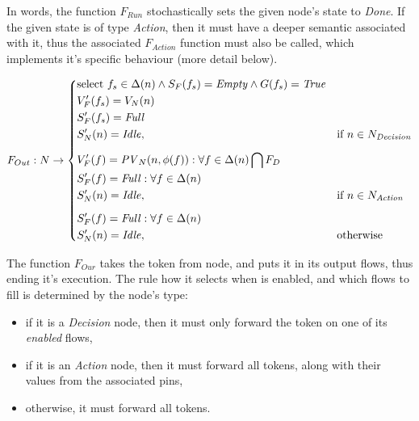 \begin{definition}
In words, the function \(F_{Run}\) stochastically sets the given node's state to \emph{Done}. If the given state is of type \emph{Action}, then it must have a deeper semantic associated with it, thus the associated \(F_{Action}\) function must also be called, which implements it's specific behaviour (more detail below).

\begin{equation}
	F_{Out} : N \rightarrow
	\begin{cases}
		\begin{aligned}[b]
			&\text{select } f_s \in \Delta(n) \wedge S_F(f_s) = \mathit{Empty} \wedge G(f_s) = \mathit{True} \\
			&V_F^\prime(f_s) = V_N(n) \\
			&S_F^\prime(f_s) = \mathit{Full} \\
			&S_N^\prime(n) = \mathit{Idle},
		\end{aligned} & \text{if } n \in N_\mathit{Decision} \\[8pt]
		\begin{aligned}[b]
			&V_F^\prime(f) = \mathit{PV}_N(n, \phi(f)) : \forall f \in \Delta(n) \bigcap F_D \\
			&S_F^\prime(f) = \mathit{Full} : \forall f \in \Delta(n) \\
			&S_N^\prime(n) = \mathit{Idle},
		\end{aligned} & \text{if } n \in N_\mathit{Action} \\[8pt]
		\begin{aligned}[b]
			&S_F^\prime(f) = \mathit{Full} : \forall f \in \Delta(n) \\
			&S_N^\prime(n) = \mathit{Idle},
		\end{aligned} & \text{otherwise}
	\end{cases}
\end{equation}

The function \(F_{Our}\) takes the token from node, and puts it in its output flows, thus ending it's execution. The rule how it selects when is enabled, and which flows to fill is determined by the node's type:

\begin{itemize}
\item if it is a \emph{Decision} node, then it must only forward the token on one of its \emph{enabled} flows,
\item if it is an \emph{Action} node, then it must forward all tokens, along with their values from the associated pins,
\item otherwise, it must forward all tokens.
\end{itemize}

\end{definition}\label{def:activity-state-change}

